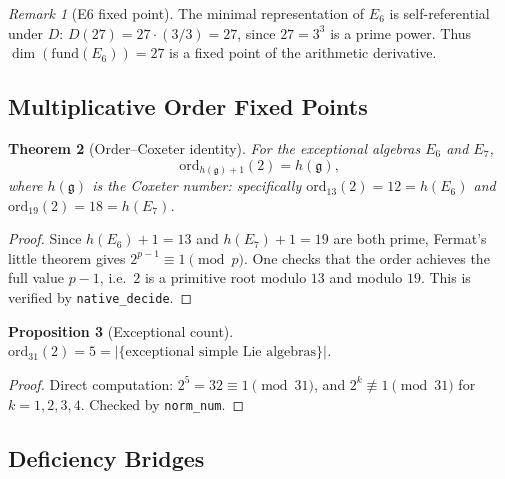 \documentclass[11pt]{amsart}
\theoremstyle{plain}
\newtheorem{theorem}{Theorem}[section]
\newtheorem{proposition}[theorem]{Proposition}
\theoremstyle{definition}
\theoremstyle{remark}
\newtheorem{remark}[theorem]{Remark}
\begin{document}
\begin{remark}[E6 fixed point]
The minimal representation of $E_6$ is self-referential under $D$:
$D(27) = 27 \cdot (3/3) = 27$, since $27 = 3^3$ is a prime power.
Thus $\dim(\mathrm{fund}(E_6)) = 27$ is a fixed point of the arithmetic
derivative.
\end{remark}

\subsection{Multiplicative Order Fixed Points}\label{sec:mult-order}

\begin{theorem}[Order--Coxeter identity]\label{thm:ord-coxeter}
For the exceptional algebras $E_6$ and $E_7$,
\[
  \mathrm{ord}_{h(\mathfrak{g})+1}(2) = h(\mathfrak{g}),
\]
where $h(\mathfrak{g})$ is the Coxeter number:
specifically $\mathrm{ord}_{13}(2) = 12 = h(E_6)$ and
$\mathrm{ord}_{19}(2) = 18 = h(E_7)$.
\end{theorem}

\begin{proof}
Since $h(E_6)+1 = 13$ and $h(E_7)+1 = 19$ are both prime, Fermat's
little theorem gives $2^{p-1} \equiv 1 \pmod{p}$.  One checks that the
order achieves the full value $p-1$, i.e.\ $2$ is a primitive root
modulo $13$ and modulo $19$.  This is verified by \texttt{native\_decide}.
\end{proof}

\begin{proposition}[Exceptional count]\label{prop:ord31}
$\mathrm{ord}_{31}(2) = 5 = |\{\text{exceptional simple Lie algebras}\}|$.
\end{proposition}

\begin{proof}
Direct computation: $2^5 = 32 \equiv 1 \pmod{31}$, and
$2^k \not\equiv 1 \pmod{31}$ for $k = 1,2,3,4$.  Checked by
\texttt{norm\_num}.
\end{proof}

\subsection{Deficiency Bridges}\label{sec:deficiency}
\end{document}
